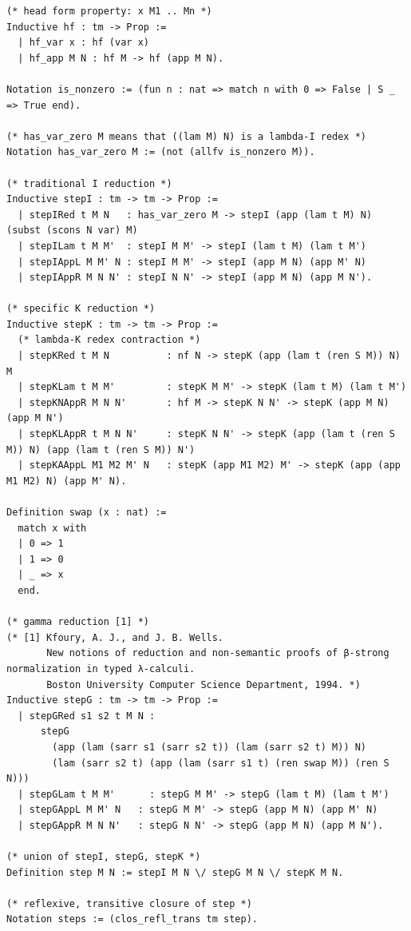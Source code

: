 \documentclass[10pt,a4paper]{article}
\begin{document}
\begin{lstlisting}[style=authorcoq]
(* head form property: x M1 .. Mn *)
Inductive hf : tm -> Prop :=
  | hf_var x : hf (var x)
  | hf_app M N : hf M -> hf (app M N).

Notation is_nonzero := (fun n : nat => match n with 0 => False | S _ => True end).

(* has_var_zero M means that ((lam M) N) is a lambda-I redex *)
Notation has_var_zero M := (not (allfv is_nonzero M)).

(* traditional I reduction *)
Inductive stepI : tm -> tm -> Prop :=
  | stepIRed t M N   : has_var_zero M -> stepI (app (lam t M) N) (subst (scons N var) M)
  | stepILam t M M'  : stepI M M' -> stepI (lam t M) (lam t M')
  | stepIAppL M M' N : stepI M M' -> stepI (app M N) (app M' N)
  | stepIAppR M N N' : stepI N N' -> stepI (app M N) (app M N').

(* specific K reduction *)
Inductive stepK : tm -> tm -> Prop :=
  (* lambda-K redex contraction *)
  | stepKRed t M N          : nf N -> stepK (app (lam t (ren S M)) N) M
  | stepKLam t M M'         : stepK M M' -> stepK (lam t M) (lam t M')
  | stepKNAppR M N N'       : hf M -> stepK N N' -> stepK (app M N) (app M N')
  | stepKLAppR t M N N'     : stepK N N' -> stepK (app (lam t (ren S M)) N) (app (lam t (ren S M)) N')
  | stepKAAppL M1 M2 M' N   : stepK (app M1 M2) M' -> stepK (app (app M1 M2) N) (app M' N).

Definition swap (x : nat) :=
  match x with
  | 0 => 1
  | 1 => 0
  | _ => x
  end.

(* gamma reduction [1] *)
(* [1] Kfoury, A. J., and J. B. Wells.
       New notions of reduction and non-semantic proofs of β-strong normalization in typed λ-calculi.
       Boston University Computer Science Department, 1994. *)
Inductive stepG : tm -> tm -> Prop :=
  | stepGRed s1 s2 t M N : 
      stepG
        (app (lam (sarr s1 (sarr s2 t)) (lam (sarr s2 t) M)) N)
        (lam (sarr s2 t) (app (lam (sarr s1 t) (ren swap M)) (ren S N)))
  | stepGLam t M M'      : stepG M M' -> stepG (lam t M) (lam t M')
  | stepGAppL M M' N   : stepG M M' -> stepG (app M N) (app M' N)
  | stepGAppR M N N'   : stepG N N' -> stepG (app M N) (app M N').

(* union of stepI, stepG, stepK *)
Definition step M N := stepI M N \/ stepG M N \/ stepK M N.

(* reflexive, transitive closure of step *)
Notation steps := (clos_refl_trans tm step).
\end{lstlisting}
\clearpage
\end{document}
